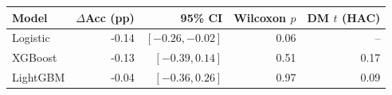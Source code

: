 \begin{tabular}{@{}lrrrr@{}}
\toprule
Model & $\Delta$Acc (pp) & 95\% CI & Wilcoxon $p$ & DM $t$ (HAC) \\
\midrule
Logistic & -0.14 & $[-0.26,-0.02]$ & 0.06 & -- \\
XGBoost & -0.13 & $[-0.39,0.14]$ & 0.51 & 0.17 \\
LightGBM & -0.04 & $[-0.36,0.26]$ & 0.97 & 0.09 \\
\bottomrule
\end{tabular}
